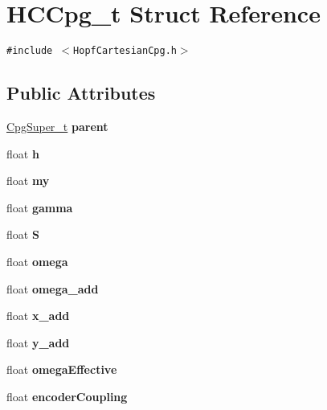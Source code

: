 \hypertarget{structHCCpg__t}{
\section{HCCpg\_\-t Struct Reference}
\label{structHCCpg__t}
}
{\tt \#include $<$HopfCartesianCpg.h$>$}

\subsection*{Public Attributes}
\begin{CompactItemize}
\item 
\hypertarget{structHCCpg__t_2dfc0d57b86280a9b6f750d21524e254}{
\hyperlink{structCpgSuper__t}{CpgSuper\_\-t} \textbf{parent}}
\label{structHCCpg__t_2dfc0d57b86280a9b6f750d21524e254}

\item 
\hypertarget{structHCCpg__t_269185d9ec39f5839c9f22e1eb2fdddd}{
float \textbf{h}}
\label{structHCCpg__t_269185d9ec39f5839c9f22e1eb2fdddd}

\item 
\hypertarget{structHCCpg__t_3ab90485820c903cc14ce6cc5e1e7cb9}{
float \textbf{my}}
\label{structHCCpg__t_3ab90485820c903cc14ce6cc5e1e7cb9}

\item 
\hypertarget{structHCCpg__t_518a0b06c4e4bfde99545f2e0ba09d26}{
float \textbf{gamma}}
\label{structHCCpg__t_518a0b06c4e4bfde99545f2e0ba09d26}

\item 
\hypertarget{structHCCpg__t_c51c48165276633429d584ce7fbfbe83}{
float \textbf{S}}
\label{structHCCpg__t_c51c48165276633429d584ce7fbfbe83}

\item 
\hypertarget{structHCCpg__t_13f132c4fb00b9b2b3e3b07685ec9506}{
float \textbf{omega}}
\label{structHCCpg__t_13f132c4fb00b9b2b3e3b07685ec9506}

\item 
\hypertarget{structHCCpg__t_0f7c930df5af809da31e24abef8e7386}{
float \textbf{omega\_\-add}}
\label{structHCCpg__t_0f7c930df5af809da31e24abef8e7386}

\item 
\hypertarget{structHCCpg__t_375aa053a201d64536d0dddb5fa2a0c2}{
float \textbf{x\_\-add}}
\label{structHCCpg__t_375aa053a201d64536d0dddb5fa2a0c2}

\item 
\hypertarget{structHCCpg__t_16157841bc9790cadb8aae12cc684f4e}{
float \textbf{y\_\-add}}
\label{structHCCpg__t_16157841bc9790cadb8aae12cc684f4e}

\item 
\hypertarget{structHCCpg__t_48b4958ee6140d11c7be92478bb642f7}{
float \textbf{omegaEffective}}
\label{structHCCpg__t_48b4958ee6140d11c7be92478bb642f7}

\item 
\hypertarget{structHCCpg__t_a650379f043890794de00e980d26fc21}{
float \textbf{encoderCoupling}}
\label{structHCCpg__t_a650379f043890794de00e980d26fc21}

\end{CompactItemize}


